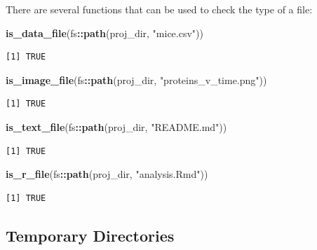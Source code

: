 \documentclass[12pt,twoside]{reedthesis}
\newenvironment{Shaded}{\begin{snugshade}}{\end{snugshade}}
\newcommand{\KeywordTok}[1]{\textcolor[rgb]{0.13,0.29,0.53}{\textbf{#1}}}
\newcommand{\StringTok}[1]{\textcolor[rgb]{0.31,0.60,0.02}{#1}}
\newcommand{\OperatorTok}[1]{\textcolor[rgb]{0.81,0.36,0.00}{\textbf{#1}}}
\newcommand{\NormalTok}[1]{#1}
\begin{document}
There are several functions that can be used to check the type of a
file:
\begin{Shaded}
\begin{Highlighting}[]
\KeywordTok{is_data_file}\NormalTok{(fs}\OperatorTok{::}\KeywordTok{path}\NormalTok{(proj_dir, }\StringTok{"mice.csv"}\NormalTok{))}
\end{Highlighting}
\end{Shaded}
\begin{verbatim}
[1] TRUE
\end{verbatim}
\begin{Shaded}
\begin{Highlighting}[]
\KeywordTok{is_image_file}\NormalTok{(fs}\OperatorTok{::}\KeywordTok{path}\NormalTok{(proj_dir, }\StringTok{"proteins_v_time.png"}\NormalTok{))}
\end{Highlighting}
\end{Shaded}
\begin{verbatim}
[1] TRUE
\end{verbatim}
\begin{Shaded}
\begin{Highlighting}[]
\KeywordTok{is_text_file}\NormalTok{(fs}\OperatorTok{::}\KeywordTok{path}\NormalTok{(proj_dir, }\StringTok{"README.md"}\NormalTok{))}
\end{Highlighting}
\end{Shaded}
\begin{verbatim}
[1] TRUE
\end{verbatim}
\begin{Shaded}
\begin{Highlighting}[]
\KeywordTok{is_r_file}\NormalTok{(fs}\OperatorTok{::}\KeywordTok{path}\NormalTok{(proj_dir, }\StringTok{"analysis.Rmd"}\NormalTok{))}
\end{Highlighting}
\end{Shaded}
\begin{verbatim}
[1] TRUE
\end{verbatim}
\subsection{Temporary Directories}\label{temporary-directories}
\end{document}
